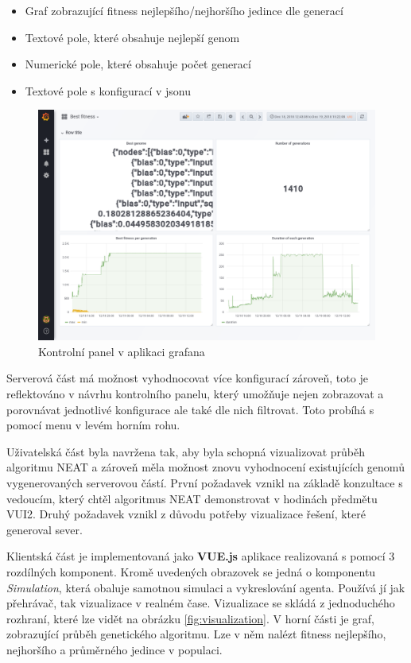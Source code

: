 \begin{itemize}
	\item Graf zobrazující fitness nejlepšího/nejhoršího jedince dle generací
	\item Textové pole, které obsahuje nejlepší genom
	\item Numerické pole, které obsahuje počet generací
	\item Textové pole s konfigurací v jsonu
\end{itemize}
\begin{figure}[H]
	\centering
	\includegraphics[width=0.6\linewidth]{grafana}
	\caption{Kontrolní panel v aplikaci grafana}
	\label{fig:grafana}
\end{figure}

Serverová část má možnost vyhodnocovat více konfigurací zároveň, toto je reflektováno v návrhu kontrolního panelu, který umožňuje nejen zobrazovat a porovnávat jednotlivé konfigurace ale také dle nich filtrovat. Toto probíhá s pomocí menu v levém horním rohu.

Uživatelská část byla navržena tak, aby byla schopná vizualizovat průběh algoritmu NEAT a zároveň měla možnost znovu vyhodnocení existujících genomů vygenerovaných serverovou částí. První požadavek vznikl na základě konzultace s vedoucím, který chtěl algoritmus NEAT demonstrovat v hodinách předmětu VUI2. Druhý požadavek vznikl z důvodu potřeby vizualizace řešení, které generoval sever.

Klientská část je implementovaná jako \textbf{VUE.js} aplikace realizovaná s pomocí 3 rozdílných komponent. Kromě uvedených obrazovek se jedná o komponentu \emph{Simulation}, která obaluje samotnou simulaci a vykreslování agenta. Používá jí jak přehrávač, tak vizualizace v realném čase.
Vizualizace se skládá z jednoduchého rozhraní, které lze vidět na obrázku \ref{fig:visualization}. V horní části je graf, zobrazující průběh genetického algoritmu. Lze v něm nalézt fitness nejlepšího, nejhoršího a průměrného jedince v populaci.


